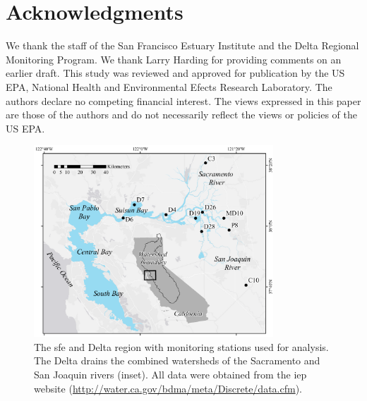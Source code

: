 \documentclass[letterpaper,12pt,oneside]{article}\usepackage[]{graphicx}\usepackage[]{color}
\begin{document}
\section*{Acknowledgments}

We thank the staff of the San Francisco Estuary Institute and the Delta Regional Monitoring Program. We thank Larry Harding for providing comments on an earlier draft. This study was reviewed and approved for publication by the US EPA, National Health and Environmental Efects Research Laboratory. The authors declare no competing financial interest. The views expressed in this paper are those of the authors and do not necessarily reflect the views or policies of the US EPA. 

\begin{singlespace}


\end{singlespace}
\clearpage


\begin{figure}
\centering
\includegraphics[width=0.8\textwidth,page=1]{figs/delt_map.pdf}
\caption{The \acl{sfe} and Delta region with monitoring stations used for analysis. The Delta drains the combined watersheds of the Sacramento and San Joaquin rivers (inset). All data were obtained from the \acl{iep} website (\url{http://water.ca.gov/bdma/meta/Discrete/data.cfm})\cite{IEP13}.}
\label{fig:delt_map}   
\end{figure}
\end{document}

